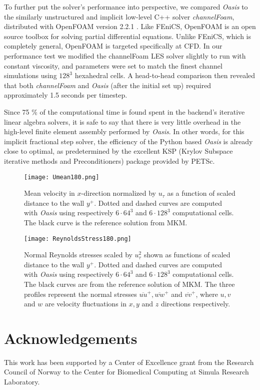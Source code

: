 \documentclass[final,3p,times,twocolumn]{elsarticle}
\newcounter{bla}
\begin{document}
To further put the solver's performance into perspective, we compared \emph{Oasis} to the similarly unstructured and implicit low-level C++ solver \emph{channelFoam}, distributed with OpenFOAM version 2.2.1 \cite{channelfoam}. Like FEniCS, OpenFOAM is an open source toolbox for solving partial differential equations. Unlike FEniCS, which is completely general, OpenFOAM is targeted specifically at CFD. In our performance test we modified the channelFoam LES solver slightly to run with constant viscosity, and parameters were set to match the finest channel simulations using $128^3$ hexahedral cells. A head-to-head comparison then revealed that both \emph{channelFoam} and \emph{Oasis} (after the initial set up) required approximately 1.5 seconds per timestep.

Since 75 \% of the computational time is found spent in the backend's iterative linear algebra solvers, it is safe to say that there is very little overhead in the high-level finite element assembly performed by \emph{Oasis}. In other words, for this implicit fractional step solver, the efficiency of the Python based \emph{Oasis} is already close to optimal, as predetermined by the excellent KSP (Krylov Subspace iterative methods and Preconditioners) package provided by PETSc. 

\begin{figure}
\texttt{[image: Umean180.png]}
\caption{Mean velocity in $x$-direction normalized by $u_{\tau}$ as a function of scaled distance to the wall $y^+$. Dotted and dashed curves are computed with \emph{Oasis} using respectively $6\cdot 64^3$ and $6\cdot 128^3$ computational cells. The black curve is the reference solution from MKM.}
\label{fig:Umean}
\end{figure}
\begin{figure}
\texttt{[image: ReynoldsStress180.png]}
\caption{Normal Reynolds stresses scaled by $u_{\tau}^2$ shown as functions of scaled distance to the wall $y^+$. Dotted and dashed curves are computed with \emph{Oasis} using respectively $6\cdot 64^3$ and $6\cdot 128^3$ computational cells. The black curves are from the reference solution of MKM. The three profiles represent the normal stresses $\overline{uu}^+, \overline{ww}^+$ and $\overline{vv}^+$, where $u, v$ and $w$ are velocity fluctuations in $x, y$ and $z$ directions respectively.}  
\label{fig:Reynoldsstress}
\end{figure}

\section*{Acknowledgements}
This work has been supported by a Center of Excellence grant from the Research Council of Norway to the Center for Biomedical Computing at Simula Research Laboratory.
\end{document}

